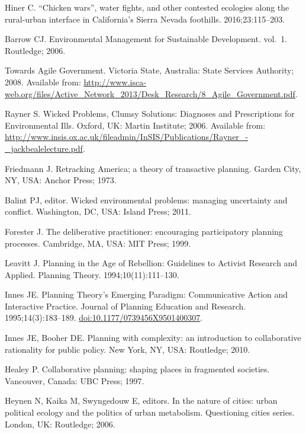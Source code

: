 \documentclass[10pt,a4paper]{article}
\begin{document}
\begin{multicols}{2}
\begin{footnotesize}
\begin{thebibliography}{100}
Hiner C.
\newblock ``{Chicken} wars'', water fights, and other contested ecologies along
  the rural-urban interface in {California}'s {Sierra} {Nevada} foothills.
  2016;23:115--203.

Barrow CJ.
\newblock Environmental {Management} for {Sustainable} {Development}. vol.~1.
\newblock Routledge; 2006.

Towards {Agile} {Government}.
\newblock Victoria State, Australia: State Services Authority; 2008.
\newblock Available from:
  \url{http://www.isca-web.org/files/Active_Network_2013/Desk_Research/8_Agile_Government.pdf}.

Rayner S.
\newblock Wicked {Problems}, {Clumsy} {Solutions}: {Diagnoses} and
  {Prescriptions} for {Environmental} {Ills}.
\newblock Oxford, UK: Martin Institute; 2006.
\newblock Available from:
  \url{http://www.insis.ox.ac.uk/fileadmin/InSIS/Publications/Rayner_-_jackbealelecture.pdf}.

Friedmann J.
\newblock Retracking {America}; a theory of transactive planning.
\newblock Garden City, NY, USA: Anchor Press; 1973.

Balint PJ, editor.
\newblock Wicked environmental problems: managing uncertainty and conflict.
\newblock Washington, DC, USA: Island Press; 2011.

Forester J.
\newblock The deliberative practitioner: encouraging participatory planning
  processes.
\newblock Cambridge, MA, USA: MIT Press; 1999.

Leavitt J.
\newblock Planning in the {Age} of {Rebellion}: {Guidelines} to {Activist}
  {Research} and {Applied}.
\newblock Planning Theory. 1994;10(11):111--130.

Innes JE.
\newblock Planning {Theory}'s {Emerging} {Paradigm}: {Communicative} {Action}
  and {Interactive} {Practice}.
\newblock Journal of Planning Education and Research. 1995;14(3):183--189.
\newblock
  \href{https://doi.org/10.1177/0739456X9501400307}{doi:10.1177/0739456X9501400307}.

Innes JE, Booher DE.
\newblock Planning with complexity: an introduction to collaborative
  rationality for public policy.
\newblock New York, NY, USA: Routledge; 2010.

Healey P.
\newblock Collaborative planning: shaping places in fragmented societies.
\newblock Vancouver, Canada: UBC Press; 1997.

Heynen N, Kaika M, Swyngedouw E, editors.
\newblock In the nature of cities: urban political ecology and the politics of
  urban metabolism.
\newblock Questioning cities series. London, UK: Routledge; 2006.


\end{thebibliography}
\end{footnotesize}
\end{multicols}
\end{document}
